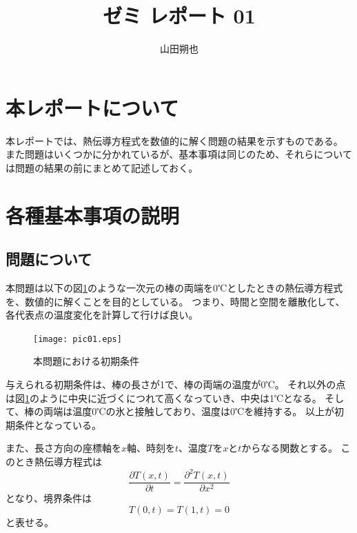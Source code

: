 \documentclass{jsarticle}
\begin{document}
\title{ゼミ レポート 01}
\author{山田朔也}
\maketitle

\section{本レポートについて}
本レポートでは、熱伝導方程式を数値的に解く問題の結果を示すものである。
また問題はいくつかに分かれているが、基本事項は同じのため、それらについては問題の結果の前にまとめて記述しておく。

\section{各種基本事項の説明}
\subsection{問題について}
本問題は以下の図\ref{fig01}のような一次元の棒の両端を0℃としたときの熱伝導方程式を、数値的に解くことを目的としている。
つまり、時間と空間を離散化して、各代表点の温度変化を計算して行けば良い。
\begin{figure}[H]
	\centering
	\texttt{[image: pic01.eps]}
	\caption{本問題における初期条件}
	\label{fig01}
\end{figure}%

与えられる初期条件は、棒の長さが1で、棒の両端の温度が0℃。
それ以外の点は図\ref{fig01}のように中央に近づくにつれて高くなっていき、中央は1℃となる。
そして、棒の両端は温度0℃の氷と接触しており、温度は0℃を維持する。
以上が初期条件となっている。

また、長さ方向の座標軸を$x$軸、時刻を$t$、温度$T$を$x$と$t$からなる関数とする。
このとき熱伝導方程式は
\begin{equation}
	\frac{\partial T(x,t)}{\partial t} = \frac{\partial ^2 T(x,t)}{\partial x^2}	\label{01}
\end{equation}
となり、境界条件は
\begin{equation}
	T(0,t) = T(1,t) = 0	\label{02}
\end{equation}
と表せる。
\end{document}
